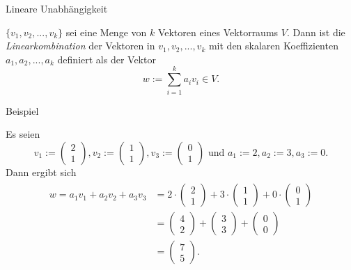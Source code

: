 \documentclass[
  8pt,
  ignorenonframetext,
]{beamer}
\begin{document}
\begin{frame}{Lineare Unabhängigkeit}
\protect\hypertarget{lineare-unabhuxe4ngigkeit}{}
\small
\begin{definition}[Linearkombination]
\justifying
$\{v_1, v_2, ..., v_k\}$ sei eine Menge von $k$ Vektoren eines Vektorraums $V$.
Dann ist die \textit{Linearkombination} der Vektoren in $v_1, v_2, ..., v_k$ mit den
skalaren Koeffizienten $a_1, a_2,...,a_k$ definiert als der Vektor
\begin{equation}
w := \sum_{i=1}^k a_i v_i \in V.
\end{equation}
\end{definition}

\footnotesize

Beispiel

Es seien \begin{equation}
v_1 := \begin{pmatrix} 2 \\ 1 \end{pmatrix},
v_2 := \begin{pmatrix} 1 \\ 1 \end{pmatrix},
v_3 := \begin{pmatrix} 0 \\ 1 \end{pmatrix}
\mbox{ und }
a_1 := 2, a_2 := 3, a_3 := 0.
\end{equation} Dann ergibt sich \begin{align}
\begin{split}
w
  = a_1v_1 + a_2v_2 + a_3v_3
& =  2 \cdot \begin{pmatrix} 2 \\ 1 \end{pmatrix}
   + 3 \cdot \begin{pmatrix} 1 \\ 1 \end{pmatrix}
   + 0 \cdot \begin{pmatrix} 0 \\ 1 \end{pmatrix}   \\
& =   \begin{pmatrix} 4 \\ 2 \end{pmatrix}
    + \begin{pmatrix} 3 \\ 3 \end{pmatrix}
    + \begin{pmatrix} 0 \\ 0 \end{pmatrix}          \\
& =   \begin{pmatrix} 7 \\ 5 \end{pmatrix}.
\end{split}
\end{align}
\end{frame}
\end{document}
